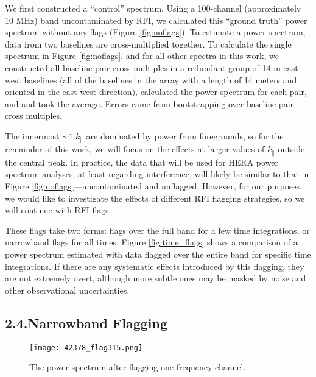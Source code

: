 \documentclass[12pt]{article}
\begin{document}
We first constructed a ``control'' spectrum. Using a 100-channel (approximately 10 MHz) band uncontaminated by RFI, we calculated this ``ground truth'' power spectrum without any flags (Figure \ref{fig:noflags}). To estimate a power spectrum, data from two baselines are cross-multiplied together. To calculate the single spectrum in Figure \ref{fig:noflags}, and for all other spectra in this work, we constructed all baseline pair cross multiples in a redundant group of 14-m east-west baselines (all of the baselines in the array with a length of 14 meters and oriented in the east-west direction), calculated the power spectrum for each pair, and  and took the average. Errors came from bootstrapping over baseline pair cross multiples.

The innermost $\sim 1 \; k_\parallel$ are dominated by power from foregrounds, so for the remainder of this work, we will focus on the effects at larger values of $k_\parallel$ outside the central peak. In practice, the data that will be used for HERA power spectrum analyses, at least regarding interference, will likely be similar to that in Figure \ref{fig:noflags}---uncontaminated and unflagged. However, for our purposes, we would like to investigate the effects of different RFI flagging strategies, so we will continue with RFI flags.

These flags take two forms: flags over the full band for a few time integrations, or narrowband flags for all times. Figure \ref{fig:time_flags} shows a comparison of a power spectrum estimated with data flagged over the entire band for specific time integrations. If there are any systematic effects introduced by this flagging, they are not extremely overt, although more subtle ones may be masked by noise and other observational uncertainties. \vspace{3mm}

\tocless\subsection{\hypertarget{subsec:narrowband}{2.4.\hspace{0.75em}Narrowband Flagging}}

\begin{figure}[p]
	\centering
	\texttt{[image: 42378\_flag315.png]}
	\caption[Power spectrum calculated with flagged time integrations and one flagged channel]{The power spectrum after flagging one frequency channel.}
	\label{fig:flag_chan315}
\end{figure}
\end{document}
